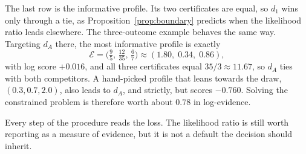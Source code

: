 The last row is the informative profile. Its two certificates are equal, so
$d_1$ wins only through a tie, as Proposition~\ref{prop:boundary} predicts
when the likelihood ratio leads elsewhere. The three-outcome example behaves
the same way. Targeting $d_A$ there, the most informative profile is exactly
\[
  \mathcal E=\bigl(\tfrac95,\,\tfrac{12}{35},\,\tfrac67\bigr)
  \approx(1.80,\;0.34,\;0.86),
\]
with log score $+0.016$, and all three certificates equal
$35/3\approx11.67$, so $d_A$ ties with both competitors. A hand-picked profile that leans towards the draw,
$(0.3,0.7,2.0)$, also leads to $d_A$, and strictly, but scores $-0.760$.
Solving the constrained problem is therefore worth about $0.78$ in
log-evidence.

Every step of the procedure reads the loss. The likelihood ratio is still
worth reporting as a measure of evidence, but it is not a default the decision
should inherit.
